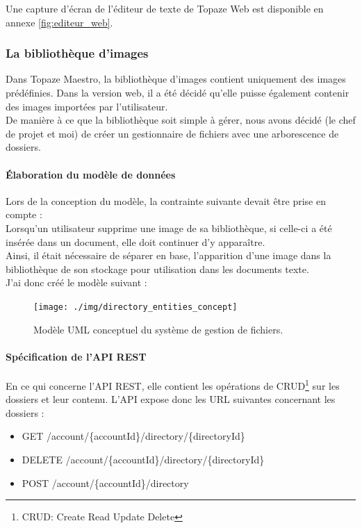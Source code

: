 Une capture d'écran de l'éditeur de texte de Topaze Web est disponible en annexe \ref{fig:editeur_web}.

\subsubsection{La bibliothèque d'images}
Dans Topaze Maestro, la bibliothèque d'images contient uniquement des images prédéfinies. Dans la version web, il a été décidé qu'elle puisse également contenir des images importées par l'utilisateur.\\
De manière à ce que la bibliothèque soit simple à gérer, nous avons décidé (le chef de projet et moi) de créer un gestionnaire de fichiers avec une arborescence de dossiers.

\paragraph*{Élaboration du modèle de données\\}
Lors de la conception du modèle, la contrainte suivante devait être prise en compte : \\
Lorsqu'un utilisateur supprime une image de sa bibliothèque, si celle-ci a été insérée dans un document, elle doit continuer d'y apparaître. \\
Ainsi, il était nécessaire de séparer en base, l'apparition d'une image dans la bibliothèque de son stockage pour utilisation dans les documents texte. \\
J'ai donc créé le modèle suivant : 

\begin{figure}[H]
  \centering
  \texttt{[image: ./img/directory\_entities\_concept]}
  \caption{\label{fig:mb_va_ast} Modèle UML conceptuel du système de gestion de fichiers.}
\end{figure}

\paragraph*{Spécification de l'API REST\\}
En ce qui concerne l'API REST, elle contient les opérations de CRUD\footnote{CRUD: Create Read Update Delete} sur les dossiers et leur contenu.
L'API expose donc les URL suivantes concernant les dossiers : 
\begin{itemize}
\item GET /account/\{accountId\}/directory/\{directoryId\}
\item DELETE /account/\{accountId\}/directory/\{directoryId\}
\item POST /account/\{accountId\}/directory
\end{itemize}

